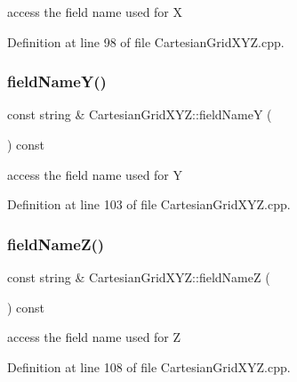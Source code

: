 access the field name used for X 



Definition at line 98 of file Cartesian\+Grid\+X\+Y\+Z.\+cpp.

\hypertarget{class_d_d4hep_1_1_geometry_1_1_cartesian_grid_x_y_z_a4925d5d084f6029486834b5cae5d7fe0}{}\label{class_d_d4hep_1_1_geometry_1_1_cartesian_grid_x_y_z_a4925d5d084f6029486834b5cae5d7fe0} 
\subsubsection{\texorpdfstring{field\+Name\+Y()}{fieldNameY()}}
{\footnotesize\ttfamily const string \& Cartesian\+Grid\+X\+Y\+Z\+::field\+NameY (\begin{DoxyParamCaption}{ }\end{DoxyParamCaption}) const}



access the field name used for Y 



Definition at line 103 of file Cartesian\+Grid\+X\+Y\+Z.\+cpp.

\hypertarget{class_d_d4hep_1_1_geometry_1_1_cartesian_grid_x_y_z_ae1ede1ac10e997686cc62191d4c25780}{}\label{class_d_d4hep_1_1_geometry_1_1_cartesian_grid_x_y_z_ae1ede1ac10e997686cc62191d4c25780} 
\subsubsection{\texorpdfstring{field\+Name\+Z()}{fieldNameZ()}}
{\footnotesize\ttfamily const string \& Cartesian\+Grid\+X\+Y\+Z\+::field\+NameZ (\begin{DoxyParamCaption}{ }\end{DoxyParamCaption}) const}



access the field name used for Z 



Definition at line 108 of file Cartesian\+Grid\+X\+Y\+Z.\+cpp.

